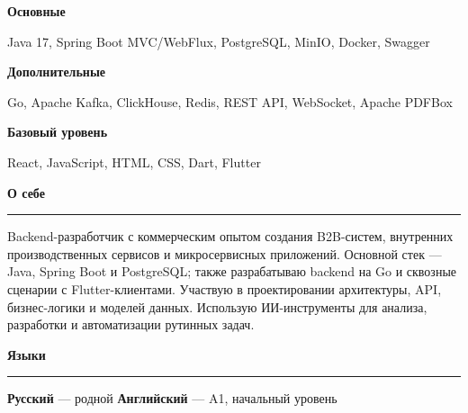 \documentclass[a4paper,10pt]{article}
\newcommand{\fontSection}{%
    \fontsize{14.5}{16.8}\selectfont
}
\newcommand{\fontBody}{%
    \fontsize{10.6}{12.7}\selectfont
}
\newcommand{\spaceBeforeSection}{9pt}
\newcommand{\spaceSectionToLine}{-4.5pt}
\newcommand{\spaceAfterSectionLine}{5.5pt}
\newcommand{\resumeSection}[1]{%
    \par
    \vspace{\spaceBeforeSection}%
    {%
        \fontSection
        \bfseries
        \color{accent}
        #1\par
    }%
    \vspace{\spaceSectionToLine}%
    {%
        \color{accent}
        \noindent
        \rule{\textwidth}{0.7pt}\par
    }%
    \vspace{\spaceAfterSectionLine}%
}
\begin{document}
{\fontBody

\textbf{\color{accent}Основные}

\vspace{3pt}

Java 17, Spring Boot MVC/WebFlux, PostgreSQL, MinIO, Docker, Swagger

\vspace{9pt}

\textbf{\color{accent}Дополнительные}

\vspace{3pt}

Go, Apache Kafka, ClickHouse, Redis, REST API, WebSocket, Apache PDFBox

\vspace{9pt}

\textbf{\color{accent}Базовый уровень}

\vspace{3pt}

React, JavaScript, HTML, CSS, Dart, Flutter

}


\resumeSection{О себе}

{\fontBody
Backend-разработчик с коммерческим опытом создания B2B-систем,
внутренних производственных сервисов и микросервисных приложений.
Основной стек — Java, Spring Boot и PostgreSQL; также разрабатываю
backend на Go и сквозные сценарии с Flutter-клиентами. Участвую
в проектировании архитектуры, API, бизнес-логики и моделей данных.
Использую ИИ-инструменты для анализа, разработки и автоматизации
рутинных задач.
}


\resumeSection{Языки}

{\fontBody
\textbf{Русский} — родной
\hspace{15pt}
\textbullet
\hspace{15pt}
\textbf{Английский} — A1, начальный уровень
}
\end{document}
